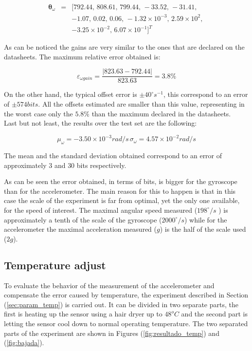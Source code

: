 \documentclass[conference]{IEEEtran}
\newcommand{\refp}[1]{(\ref{#1})}
\begin{document}
\begin{eqnarray}
\boldsymbol{\theta}_\omega &=& [792.44,\, 808.61, \, 799.44, \, -33.52, \, -31.41, \\ \nonumber
& & -1.07, \, 0.02, \, 0.06, \, -1.32 \times 10^{-3}, \, 2.59\times 10^{2}, \, \\ \nonumber
& & -3.25 \times 10^{-2}, \, 6.07\times 10^{-1}]^T \nonumber
\end{eqnarray}

As can be noticed the gains are very similar to the ones that are declared on the datasheets. The maximum relative error obtained is:

\begin{equation}
\varepsilon_{\omega gain} = \frac{|823.63 - 792.44|}{823.63} = 3.8 \%
\end{equation}

On the other hand, the typical offset error is $\pm 40 ^\circ s^{-1}$, this correspond to an error of $\pm 574 bits$. All the offsets estimated are smaller than this value, representing in the worst case only the $5.8 \%$ than the maximum declared in the datasheets. \\

Last but not least, the results over the test set are the following:

\begin{equation}
\mu_\omega = -3.50 \times 10^{-3} rad/s\, \sigma_\omega = 4.57 \times 10^{-2} rad/s
\end{equation}

The mean and the standard deviation obtained correspond to an error of approximately $3$ and $30$ bits respectively. 

As can be seen the error obtained, in terms of bits, is bigger for the gyroscope than for the accelerometer. The main reason for this to happen is that in this case the scale of the experiment is far from optimal, yet the only one available, for the speed of interest. The maximal angular speed measured ($198 ^{\circ} /s$ ) is approximately a tenth of the scale of the gyroscope ($2000^{\circ} /s$) while for the accelerometer the maximal acceleration measured ($g$) is the half of the scale used ($2 g$). 

\subsection{Temperature adjust}

To evaluate the behavior of the measurement of the accelerometer and compensate the error caused by temperature, the experiment described in Section \refp{sec:param_temp} is carried out. It can be divided in two separate parts, the first is heating up the sensor using a hair dryer up to $48^oC$ and the second part is letting the sensor cool down to normal operating temperature. The two separated parts of the experiment are shown in Figures \refp{fig:resultado_temp} and \refp{fig:bajada}.
\end{document}
